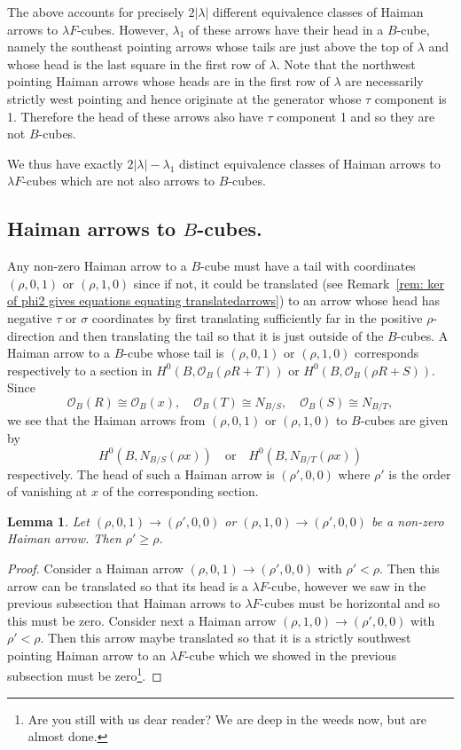 \documentclass[12pt]{amsart}
\newtheorem{lemma}[theorem]{Lemma}
\theoremstyle{definition}
\renewcommand{\O}{\mathcal{O}}
\begin{document}
The above accounts for precisely $2|\lambda |$ different equivalence
classes of Haiman arrows to $\lambda F$-cubes. However, $\lambda_{1}$
of these arrows have their head in a $B$-cube, namely the southeast
pointing arrows whose tails are just above the top of $\lambda$ and
whose head is the last square in the first row of $\lambda$. Note that
the northwest pointing Haiman arrows whose heads are in the first row
of $\lambda$ are necessarily strictly west pointing and hence
originate at the generator whose $\tau$ component is 1. Therefore the
head of these arrows also have $\tau$ component 1 and so they are not
$B$-cubes.

We thus have exactly $2|\lambda |-\lambda_{1}$ distinct equivalence
classes of Haiman arrows to $\lambda F$-cubes which are not also
arrows to $B$-cubes.

\subsection{Haiman arrows to $B$-cubes.}  Any non-zero Haiman arrow to
a $B$-cube must have a tail with coordinates $(\rho ,0,1)$ or $(\rho
,1,0)$ since if not, it could be translated (see Remark~\ref{rem: ker
of phi2 gives equations equating translatedarrows}) to an arrow whose
head has negative $\tau$ or $\sigma$ coordinates by first translating
sufficiently far in the positive $\rho$-direction and then translating
the tail so that it is just outside of the $B$-cubes. A Haiman arrow
to a $B$-cube whose tail is $(\rho ,0,1)$ or $(\rho ,1,0)$ corresponds
respectively to a section in $H^{0}(B,\O_{B}(\rho R+T))$ or
$H^{0}(B,\O_{B}(\rho R+S))$. Since
\[
\O_B (R)\cong \O_{B}(x),\quad \O_{B}(T)\cong N_{B/S},\quad \O_{B}(S)\cong N_{B/T},
\]
we see that the Haiman arrows from $(\rho ,0,1)$ or $(\rho ,1,0)$ to
$B$-cubes are given by 
\[
H^{0}(B,N_{B/S}(\rho x)) \quad \text{or}\quad
H^{0}(B,N_{B/T}(\rho x))
\]
respectively. The head of such a Haiman
arrow is $(\rho ',0,0)$ where $\rho '$ is the order of vanishing at
$x$ of the corresponding section.

\begin{lemma}\label{lem: Haiman arrows to B-cubes must vanish to the
order of the generator} Let $(\rho ,0,1)\to (\rho ',0,0)$ or $(\rho
,1,0)\to (\rho ',0,0)$ be a non-zero Haiman arrow. Then $\rho '\geq
\rho$.
\end{lemma}
\begin{proof}
Consider a Haiman arrow $(\rho ,0,1)\to (\rho ',0,0)$ with $\rho
'<\rho$. Then this arrow can be translated so that its head is a
$\lambda F$-cube, however we saw in the previous subsection that
Haiman arrows to $\lambda F$-cubes must be horizontal and so this must
be zero. Consider next a Haiman arrow $(\rho ,1,0)\to (\rho ',0,0)$
with $\rho '<\rho$. Then this arrow maybe translated so that it is a
strictly southwest pointing Haiman arrow to an $\lambda F$-cube which
we showed in the previous subsection must be zero\footnote{Are you
still with us dear reader? We are deep in the weeds now, but are
almost done.}.
\end{proof}
\end{document}
